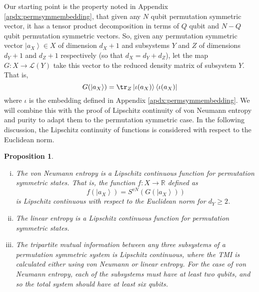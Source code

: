 \documentclass[pre,aps,showpacs,showkeys,twocolumn]{revtex4-1}
\newtheorem{proposition}{Proposition}[]
\newcommand\ket[1]{\left|#1\right\rangle}
\newcommand\op[2]{\left|#1\right\rangle\left\langle#2\right|}
\theoremstyle{definition}
\theoremstyle{remark}
\begin{document}
Our starting point is the property noted in Appendix \ref{apdx:permsymmembedding}, that given any $N$ qubit permutation symmetric vector, it has a tensor product decomposition in terms of $Q$ qubit and $N - Q$ qubit permutation symmetric vectors. So, given any permutation symmetric vector $\ket{a_X} \in X$ of dimension $d_X + 1$ and subsystems $Y$ and $Z$ of dimensions $d_Y + 1$ and $d_Z + 1$ respectively (so that $d_X = d_Y + d_Z$), let the map $G \colon X \to \mathcal{L}(Y)$ take this vector to the reduced density matrix of subsystem $Y$. That is,
\begin{equation}
    G(\ket{a_X}) = \tr_Z \op{\iota(a_X)}{\iota(a_X)}
\end{equation}
where $\iota$ is the embedding defined in Appendix \ref{apdx:permsymmembedding}. We will combine this with the proof of Lipschitz continuity of von Neumann entropy and purity \cite{hayden2006aspects} to adapt them to the permutation symmetric case. In the following discussion, the Lipschitz continuity of functions is considered with respect to the Euclidean norm.
\begin{proposition}
    \begin{enumerate}[i.]
        \item The von Neumann entropy is a Lipschitz continuous function for permutation symmetric states. That is, the function $f\colon X \to \mathbb{R}$ defined as
        \begin{equation*}
            f(\ket{a_X}) = S^{vN}(G(\ket{a_X}))
        \end{equation*}
        is Lipschitz continuous with respect to the Euclidean norm for $d_Y \geq 2$. 
        \item The linear entropy is a Lipschitz continuous function for permutation symmetric states.
        \item The tripartite mutual information between any three subsystems of a permutation symmetric system is Lipschitz continuous, where the TMI is calculated either using von Neumann or linear entropy. For the case of von Neumann entropy, each of the subsystems must have at least two qubits, and so the total system should have at least six qubits.
    \end{enumerate}
\end{proposition}
\end{document}
